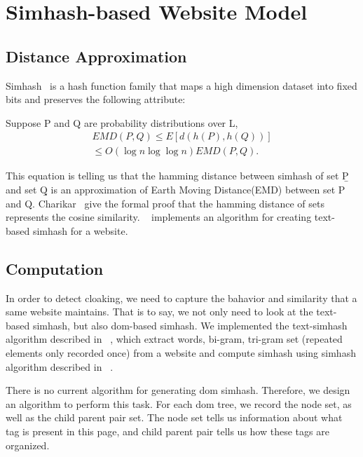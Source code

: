 \section{Simhash-based Website Model}
\label{s:swm}
\subsection{Distance Approximation}
Simhash~\cite{charikar2002similarity} is a hash function family that maps a high dimension dataset into fixed
bits and preserves the following attribute:

Suppose P and Q are probability distributions over L, 
\begin{multline}
  EMD(P, Q) \le E[d(h(P), h(Q))] \\
  \le O(\log{n}\log{\log{n}})EMD(P, Q).
\end{multline}

This equation is telling us that the hamming distance between simhash of set
\b{P} and set \b{Q} is an approximation of Earth Moving Distance(EMD) between set P
and Q. Charikar~\cite{charikar2002similarity} give the formal proof that the
hamming distance of sets represents the cosine similarity.
~\cite{manku2007detecting} implements an algorithm for creating text-based
simhash for a website.


\subsection{Computation}
In order to detect cloaking, we need to capture the bahavior and similarity that
a same website maintains. That is to say, we not only need to look at the text-based simhash,
but also dom-based simhash. We implemented the text-simhash algorithm described
in ~\cite{manku2007detecting}, which extract words, bi-gram, tri-gram set
(repeated elements only recorded once) from a website and compute simhash using
simhash algorithm described in ~\cite{charikar2002similarity}.

There is no current algorithm for generating dom simhash. Therefore, we design
an algorithm to perform this task. For each dom tree, we record the node set, as
well as the child parent pair set. The node set tells us information about what
tag is present in this page, and child parent pair tells us how these tags are
organized.

